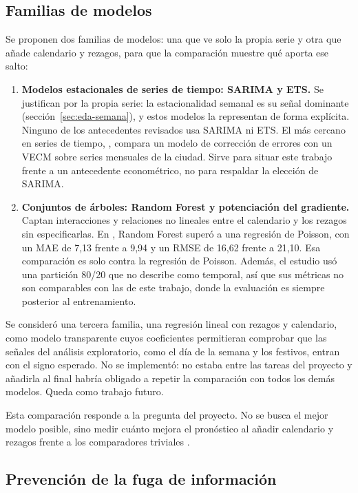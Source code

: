 \subsection{Familias de modelos}\label{sec:familias}

Se proponen dos familias de modelos: una que ve solo la propia serie y otra que añade calendario y rezagos, para que la comparación muestre qué aporta ese salto:
\begin{enumerate}
  \item \textbf{Modelos estacionales de series de tiempo: SARIMA y ETS.} Se justifican por la propia serie: la estacionalidad semanal es su señal dominante (sección~\ref{sec:eda-semana}), y estos modelos la representan de forma explícita. Ninguno de los antecedentes revisados usa SARIMA ni ETS. El más cercano en series de tiempo, \citet{garzon2025}, compara un modelo de corrección de errores con un VECM sobre series mensuales de la ciudad. Sirve para situar este trabajo frente a un antecedente econométrico, no para respaldar la elección de SARIMA.
  \item \textbf{Conjuntos de árboles: Random Forest y potenciación del gradiente.} Captan interacciones y relaciones no lineales entre el calendario y los rezagos sin especificarlas. En \citet{martinez2025}, Random Forest superó a una regresión de Poisson, con un MAE de 7,13 frente a 9,94 y un RMSE de 16,62 frente a 21,10. Esa comparación es solo contra la regresión de Poisson. Además, el estudio usó una partición 80/20 que no describe como temporal, así que sus métricas no son comparables con las de este trabajo, donde la evaluación es siempre posterior al entrenamiento.
\end{enumerate}

Se consideró una tercera familia, una regresión lineal con rezagos y calendario, como modelo transparente cuyos coeficientes permitieran comprobar que las señales del análisis exploratorio, como el día de la semana y los festivos, entran con el signo esperado. No se implementó: no estaba entre las tareas del proyecto y añadirla al final habría obligado a repetir la comparación con todos los demás modelos. Queda como trabajo futuro.

Esta comparación responde a la pregunta del proyecto. No se busca el mejor modelo posible, sino medir cuánto mejora el pronóstico al añadir calendario y rezagos frente a los comparadores triviales \citep{provost2013}.

\subsection{Prevención de la fuga de información}\label{sec:fuga}

